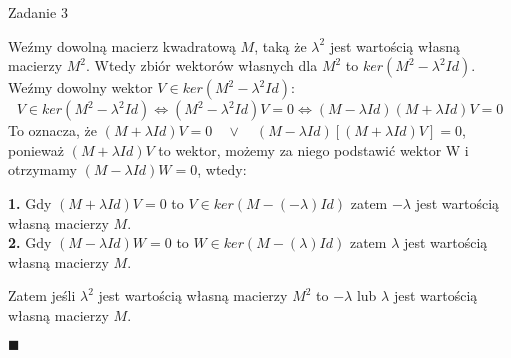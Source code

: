 \documentclass[a4paper]{article}
\begin{document}
\begin{center}
{\fontsize{20}{20}\selectfont Zadanie 3}
\end{center}

Weźmy dowolną macierz kwadratową $M$, taką że $ \lambda ^2 $ jest wartością własną macierzy $M^2$. Wtedy zbiór wektorów własnych dla $M^2$ to $ker(M^2 - \lambda ^2Id)$. Weźmy dowolny wektor $V \in ker(M^2 - \lambda ^2Id)$:
$$V \in ker(M^2 - \lambda ^2Id)\Leftrightarrow (M^2 - \lambda ^2Id)V = 0 \Leftrightarrow (M - \lambda Id)(M + \lambda Id) V = 0 $$
To oznacza, że $(M + \lambda Id) V = 0 \quad \lor \quad (M - \lambda Id) [(M + \lambda Id) V] = 0$,
ponieważ  $(M + \lambda Id) V$ to wektor, możemy za niego podstawić wektor W i otrzymamy $(M - \lambda Id) W = 0$,  wtedy:\\

\begin{adjustwidth}{30pt}{30pt}
\textbf{1.} Gdy $(M + \lambda Id) V = 0$ to $V \in ker(M - (-\lambda)Id)$ zatem $-\lambda$ jest wartością własną macierzy $M$.\\
\textbf{2.} Gdy $(M - \lambda Id) W = 0$ to $W \in ker(M - (\lambda)Id)$ zatem $\lambda$ jest wartością własną macierzy $M$.\\
\end{adjustwidth}
Zatem jeśli $ \lambda ^2 $ jest wartością własną macierzy $M^2$ to $-\lambda$ lub $\lambda$ jest wartością własną macierzy $M$.

\hspace{460pt}$\blacksquare$
\end{document}

